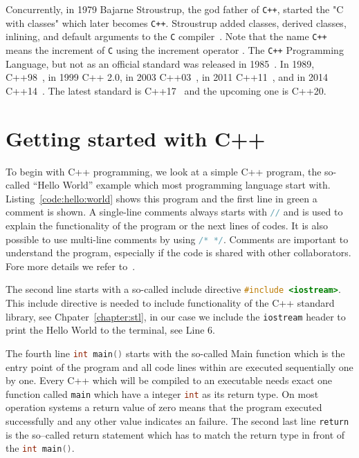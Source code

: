 Concurrently, in 1979 Bajarne Stroustrup, the god father of \texttt{C++}, started the "C with classes" which later becomes \texttt{C++}. Stroustrup added classes, derived classes, inlining, and default arguments to the \texttt{C} compiler~\cite{stroustrup1996history}. Note that the name \texttt{C++} means the increment of \texttt{C} using the increment operator \cpp{++}. The \texttt{C++} Programming Language, but not as an official standard was released in 1985~\cite{stroustrup2000c++}. In 1989, C++98~\cite{koenig1998standard}, in 1999 C++ 2.0, in 2003 C++03~\cite{c++2003iso}, in 2011 C++11~\cite{c++2011iso}, and in 2014 C++14~\cite{c++2014iso}. The latest standard is C++17~\cite{smith2017iso} and the upcoming one is C++20.


\section{Getting started with C++}
To begin with C++ programming, we look at a simple C++ program, the so-called ``Hello World'' example which most programming language start with. Listing~\ref{code:hello:world} shows this program and the first line in green a comment is shown. A  single-line comments always starts with \lstinline[language=C++]|//| and is used to explain the functionality of the program or the next lines of codes. It is also possible to use multi-line comments by using \lstinline[language=C++]{/* */}. Comments are important to understand the program, especially if the code is shared with other collaborators. Fore more details we refer to~\cite{kernighan1974elements}.

The second line starts with a so-called include directive \lstinline[language=C++]{#include <iostream>}. This include directive is needed to include functionality of the C++ standard library, see Chpater~\ref{chapter:stl}, in our case we include the \lstinline|iostream| header to print the Hello World to the terminal, see Line 6.

The fourth line \lstinline[language=C++]{int main()} starts with the so-called Main function which is the entry point of the program and all code lines within are executed sequentially one by one. Every C++ which will be compiled to an executable needs exact one function called \lstinline[language=C++]|main| which have a integer \lstinline[language=C++]{int} as its return type. On most operation systems a return value of zero means that the program executed successfully and any other value indicates an failure. The second last line \lstinline[]|return| is the so--called return statement which has to match the return type in front of the \lstinline[language=C++]{int main()}.



